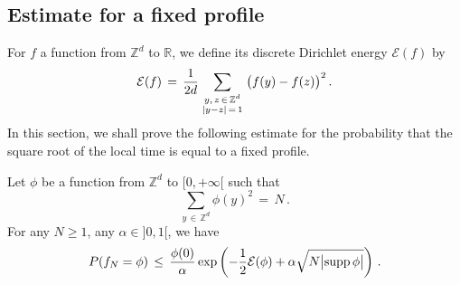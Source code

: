 \documentclass[10pt]{amsart}
\theoremstyle{definition}\newtheorem{defi}[theo]{Definition}\newtheorem{rema}[theo]{Remark}\newtheorem{exam}[theo]{Example}\newtheorem{exem}[theo]{Example}\newtheorem{nota}[theo]{Notation}
\newcommand{\tatop}[2]{\genfrac{}{}{0pt}{1}{#1}{#2}}
\newcommand*\supp{\text{supp\,}}
\newcommand*\Zd {{\mathbb Z^d}}
\newcommand*\R{\mathbb{R}}
\newcommand{\cE}{\mathcal{E}}
\begin{document}
\subsection{Estimate for a fixed profile}
For $f$ a function from $\Zd$ to $\R$, we define its discrete Dirichlet energy $\cE(f)$ by
\[
\cE(f)\,=\,
\frac{1}{2d}
\sum_{\tatop{y,\,z\,\in\,\Zd}{|y-z|\,=\,1}}
\big(f(y)-f(z)\big)^2\,.
\]
In this section, we shall prove the following estimate for the probability that the square root of the local time is equal to a fixed profile.
\begin{prop}\label{profix}
Let $\phi$ be a function from $\Zd$ to $[0,+\infty[$ such that
\[
\sum_{y\,\in\,\Zd}\phi(y)^2\,=\,N\,.
\]
For any $N\geq 1$, any $\alpha\in]0,1[$, we have
\[
P(f_N=\phi)\,\leq\,
\frac{\phi(0) }{\alpha}
\exp\left(-\frac{1}{2}\cE(\phi) +\alpha
\sqrt{N\big|\supp\phi\big|}
\right)\,.
\]
\end{prop}
\end{document}
